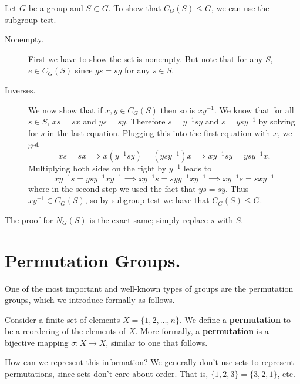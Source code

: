     \begin{prf}
        Let $G$ be a group and $S \subset G$. To show that $C_G(S) \le
        G$, we can use the subgroup test. 
        \begin{description}
            \item[Nonempty.] First we have to show the set is
            nonempty. But note that for any $S$, $e \in C_G(S)$ 
            since $gs = sg$ for any $s \in S$.

            \item[Inverses.] We now show that if $x, y \in C_G(S)$
            then so is $xy^{-1}$. We know that for all $s \in S$, $xs
            = sx$ and $ys = sy$. Therefore $s = y^{-1}sy$ and $s =
            ysy^{-1}$ by solving for $s$ in the last equation.
            Plugging this into the first equation with $x$, we get 
            \[
                xs = sx \implies x(y^{-1}sy) = (ysy^{-1})x 
                \implies xy^{-1}sy = ysy^{-1}x.
            \]
            Multiplying both sides on the right by $y^{-1}$ leads to 
            \[
                xy^{-1}s = ysy^{-1}xy^{-1} 
                \implies xy^{-1}s = syy^{-1}xy^{-1}
                \implies xy^{-1}s = sxy^{-1}
            \]
            where in the second step we used the fact that $ys = sy$.
            Thus $xy^{-1} \in C_G(S)$, so by subgroup test we have
            that $C_G(S) \le G$. 
        \end{description}

        The proof for $N_G(S)$ is the exact same; simply replace $s$
        with $S$.
    \end{prf}

    \newpage
    \section{Permutation Groups.}
    One of the most important and well-known types of groups are the
    permutation groups, which we introduce formally as follows. 

    Consider a finite set of elements $X = \{1, 2, \dots, n\}$. We
    define a 
    \textbf{permutation} to be a reordering of the elements of $X$.
    More formally, a \textbf{permutation} is a bijective mapping
    $\sigma: X \to X$, similar to one that follows. 

    How can we represent this information? We generally don't use sets
    to represent permutations, since sets 
    don't care about order. That is, $\{1, 2, 3\} = \{3,2,1\}$, etc.  


